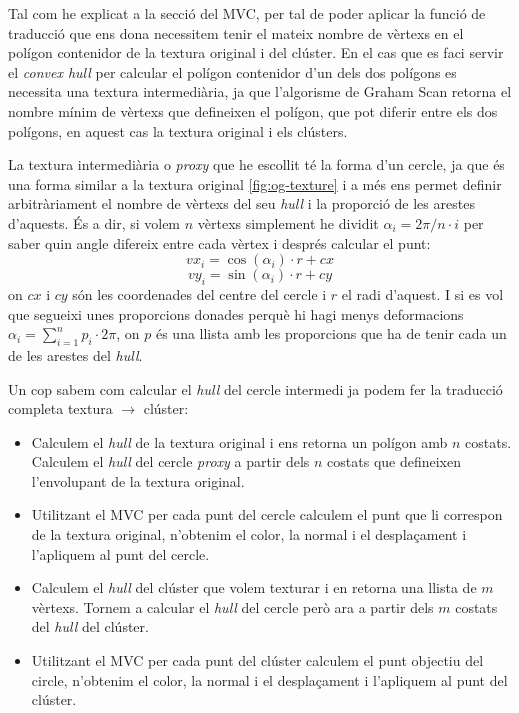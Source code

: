 \documentclass{article}
\begin{document}
Tal com he explicat a la secció del MVC, per tal de poder aplicar la funció de traducció que ens dona necessitem tenir el mateix nombre de vèrtexs en el polígon contenidor de la textura original i del clúster. En el cas que es faci servir el \textit{convex hull} per calcular el polígon contenidor d'un dels dos polígons es necessita una textura intermediària, ja que l'algorisme de Graham Scan retorna el nombre mínim de vèrtexs que defineixen el polígon, que pot diferir entre els dos polígons, en aquest cas la textura original i els clústers.

La textura intermediària o \textit{proxy} que he escollit té la forma d'un cercle, ja que és una forma similar a la textura original \ref{fig:og-texture} i a més ens permet definir arbitràriament el nombre de vèrtexs del seu \textit{hull} i la proporció de les arestes d'aquests. És a dir, si volem $n$ vèrtexs simplement he dividit $\alpha_i = 2 \pi / n \cdot i$ per saber quin angle difereix entre cada vèrtex i després calcular el punt:
$$vx_i = \cos(\alpha_i) \cdot r + cx$$
$$vy_i = \sin(\alpha_i) \cdot r + cy$$
on $cx$ i $cy$ són les coordenades del centre del cercle i $r$ el radi d'aquest.
I si es vol que segueixi unes proporcions donades perquè hi hagi menys deformacions $\alpha_i = {\sum_{i=1}^{n} p_i} \cdot 2\pi $,
on $p$ és una llista amb les proporcions que ha de tenir cada un de les arestes del \textit{hull}.

Un cop sabem com calcular el \textit{hull} del cercle intermedi ja podem fer la traducció completa textura $\rightarrow$ clúster:

\begin{itemize}
    \item Calculem el \textit{hull} de la textura original i ens retorna un polígon amb $n$ costats. Calculem el \textit{hull} del cercle \textit{proxy} a partir dels $n$ costats que defineixen l'envolupant de la textura original.
    \item Utilitzant el MVC per cada punt del cercle calculem el punt que li correspon de la textura original, n'obtenim el color, la normal i el desplaçament i l'apliquem al punt del cercle.
    \item Calculem el \textit{hull} del clúster que volem texturar i en retorna una llista de $m$ vèrtexs. Tornem a calcular el \textit{hull} del cercle però ara a partir dels $m$ costats del \textit{hull} del clúster.
    \item Utilitzant el MVC per cada punt del clúster calculem el punt objectiu del circle, n'obtenim el color, la normal i el desplaçament i l'apliquem al punt del clúster.
\end{itemize}
\end{document}
